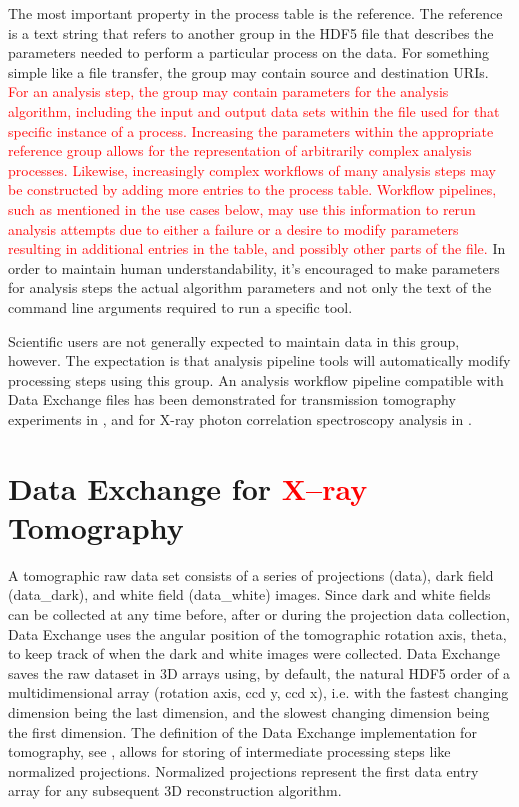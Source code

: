 \documentclass[pdf]{iucr}              %
\begin{document}
The most important property in the process table is the reference. The reference is a text string that refers to another group in the HDF5 file that describes the parameters needed to perform a particular process on the data. For something simple like a file transfer, the group may contain source and destination URIs. \textcolor{red}{For an analysis step, the group may contain parameters for the analysis algorithm, including the input and output data sets within the file used for that specific instance of a process. Increasing the parameters within the appropriate reference group allows for the representation of arbitrarily complex analysis processes. Likewise, increasingly complex workflows of many analysis steps may be constructed by adding more entries to the process table. Workflow pipelines, such as mentioned in the use cases below, may use this information to rerun analysis attempts due to either a failure or a desire to modify parameters resulting in additional entries in the table, and possibly other parts of the file.} In order to maintain human understandability, it's encouraged to make parameters for analysis steps the actual algorithm parameters and not only the text of the command line arguments required to run a specific tool.

Scientific users are not generally expected to maintain data in this group, however. The expectation is that analysis pipeline tools will automatically modify processing steps using this group. An analysis workflow pipeline compatible with Data Exchange files has been demonstrated for transmission tomography experiments in \cite{schwarz_icalepcs_2013}, and for X-ray photon correlation spectroscopy analysis in \cite{khan_icalepcs_2013}.

\section{Data Exchange for \textcolor{red}{X--ray} Tomography}

A tomographic raw data set consists of a series of projections (data), dark field (data\_dark), and white field (data\_white) images. Since dark and white fields can be collected at any time before, after or during the projection data collection, Data Exchange uses the angular position of the tomographic rotation axis, theta, to keep track of when the dark and white images were collected. Data Exchange saves the raw dataset in 3D arrays using, by default, the natural HDF5 order of a multidimensional array (rotation axis, ccd y, ccd x), i.e. with the fastest changing dimension being the last dimension, and the slowest changing dimension being the first dimension. The definition of the Data Exchange implementation for tomography, see \cite{data_exchange}, allows for storing of intermediate processing steps like normalized projections. Normalized projections represent the first data entry array for any subsequent 3D reconstruction algorithm.
\end{document}
